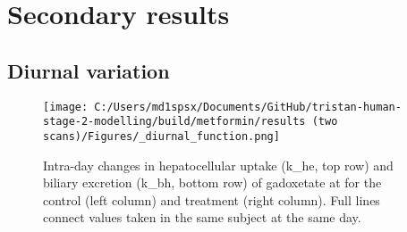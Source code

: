 \documentclass{epflreport}%
\begin{document}
\chapter{Secondary results}%
\section{Diurnal variation}%
\label{sec:Diurnalvariation}%

%


\begin{figure}[h!]%
\centering%
\texttt{[image: C:/Users/md1spsx/Documents/GitHub/tristan-human-stage-2-modelling/build/metformin/results (two scans)/Figures/\_diurnal\_function.png]}%
\caption{Intra{-}day changes in hepatocellular uptake (k\_he, top row) and biliary excretion (k\_bh, bottom row) of gadoxetate at for the control (left column) and treatment (right column). Full lines connect values taken in the same subject at the same day.}%
\end{figure}

%
\end{document}
